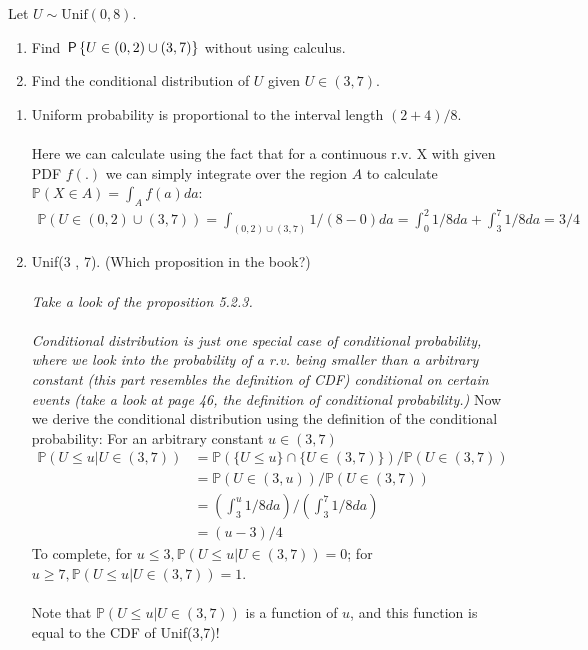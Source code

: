 

\setcounter{theorem}{9}
\begin{exercise}[BH.5.10] Let $U \sim \text{Unif}(0, 8)$.
	\begin{enumerate}
		\item Find $\P{U \in (0, 2) \cup (3, 7)}$ without using calculus.
		\item Find the conditional distribution of $U$ given $U \in (3, 7)$.
	\end{enumerate}
\begin{solution}
    \begin{enumerate}
        \item Uniform probability is proportional to the interval length $(2+4)/8$.\\~\\
    	Here we can calculate using the fact that for a continuous r.v. X with given PDF $f(.)$ we can simply integrate over the region $A$ to calculate $\mathbb{P}(X\in A) = \int_A f(a) da$:
    	\begin{align*}
    		\mathbb{P}\left(U\in (0,2) \cup (3,7)  \right) = \int_{(0,2) \cup (3,7)} 1/(8-0) da= \int_{0}^2 1/8 da+ \int_{3}^7 1/8 da =3/4
    	\end{align*}
    	
    	\item Unif(3 , 7). (Which proposition in the book?)
    	~\\~~\\
    	\textit{Take a look of the proposition 5.2.3.}\\~\\
    	\textit{Conditional distribution is just one special case of conditional probability, where we look into the probability of a r.v. being smaller than a arbitrary constant (this part resembles the definition of CDF) conditional on certain events (take a look at page 46, the definition of conditional probability.)}
    	Now we derive the conditional distribution using the definition of the conditional probability:  
    	For an arbitrary constant $u\in (3,7)$
    	\begin{align*}
    		\mathbb{P}\left(U\leq u |U\in (3,7) \right) &= \mathbb{P}\left(\{U\leq u\} \cap \{U\in (3,7)\} \right)/ \mathbb{P}\left(U\in (3,7) \right)\\
    		& = \mathbb{P}\left( U\in (3,u)  \right)/ \mathbb{P}\left(U\in (3,7) \right)\\
    		& = \left(\int_{3}^{u}1/8 da\right) /\left(\int_{3}^{7}1/8 da\right)\\
    		& =(u-3)/4
    	\end{align*}
    	To complete, 
    	for $u\leq 3, 	\mathbb{P}\left(U\leq u |U\in (3,7) \right)=0 $; for $u\geq 7, 	\mathbb{P}\left(U\leq u |U\in (3,7) \right)=1$. \\~\\
    	Note that $	\mathbb{P}\left(U\leq u |U\in (3,7) \right)$ is a function of $u$, and this function is equal to the CDF of Unif(3,7)!
    \end{enumerate}
\end{solution}
\end{exercise}


